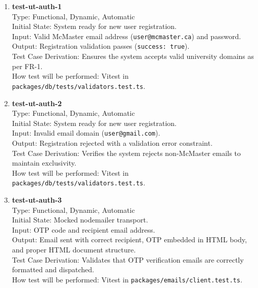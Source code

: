 \documentclass[12pt, titlepage]{article}
\begin{document}
\begin{enumerate}
\item \textbf{test-ut-auth-1}\\
Type: Functional, Dynamic, Automatic\\
Initial State: System ready for new user registration.\\
Input: Valid McMaster email address (\texttt{user@mcmaster.ca}) and password.\\
Output: Registration validation passes (\texttt{success: true}).\\
Test Case Derivation: Ensures the system accepts valid university domains as per FR-1.\\
How test will be performed: Vitest in \texttt{packages/db/tests/validators.test.ts}.\\

\item \textbf{test-ut-auth-2}\\
Type: Functional, Dynamic, Automatic\\
Initial State: System ready for new user registration.\\
Input: Invalid email domain (\texttt{user@gmail.com}).\\
Output: Registration rejected with a validation error constraint.\\
Test Case Derivation: Verifies the system rejects non-McMaster emails to maintain exclusivity.\\
How test will be performed: Vitest in \texttt{packages/db/tests/validators.test.ts}.\\

\item \textbf{test-ut-auth-3}\\
Type: Functional, Dynamic, Automatic\\
Initial State: Mocked nodemailer transport.\\
Input: OTP code and recipient email address.\\
Output: Email sent with correct recipient, OTP embedded in HTML body, and proper HTML document structure.\\
Test Case Derivation: Validates that OTP verification emails are correctly formatted and dispatched.\\
How test will be performed: Vitest in \texttt{packages/emails/client.test.ts}.\\
\end{enumerate}

\end{document}

